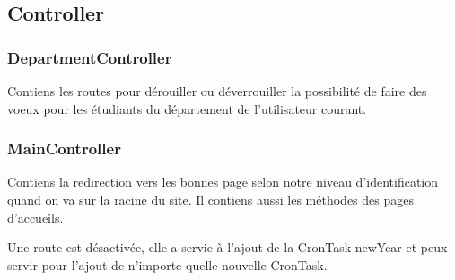 \subsection{Controller}
\subsubsection{DepartmentController}
Contiens les routes pour dérouiller ou déverrouiller la possibilité de faire des voeux pour les étudiants du département de l'utilisateur courant.

\subsubsection{MainController}
Contiens la redirection vers les bonnes page selon notre niveau d'identification quand on va sur la racine du site.
Il contiens aussi les méthodes des pages d'accueils.

Une route est désactivée, elle a servie à l'ajout de la CronTask newYear et peux servir pour l'ajout de n'importe quelle nouvelle CronTask.